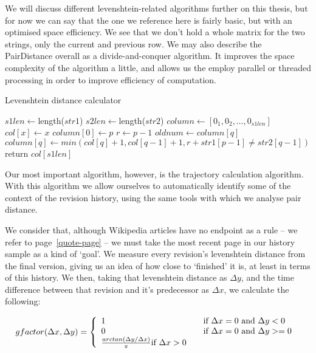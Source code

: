 We will discuss different levenshtein-related algorithms further on
this thesis, but for now we can say that the one we reference here is
fairly basic, but with an optimised space efficiency. We see that we
don't hold a whole matrix for the two strings, only the current and
previous row. We may also describe the PairDistance overall as a
divide-and-conquer algorithm. It improves the space complexity of the
algorithm a little, and allows us the employ parallel or threaded
processing in order to improve efficiency of computation.

\begin{algorithm}
  \caption{Levenshtein distance calculator}\label{lev-dist}
  \begin{algorithmic}
    \State $s1len \gets $length($str1$)
    \State $s2len \gets $length($str2$)
    \State $column \gets [0_{1}, 0_{2}, \ldots, 0_{s1len}]$
    \State $col[x] \gets x$
    \EndFor
    \State $column[0] \gets p$
    \State $r \gets p-1$
    \State $oldnum \gets column[q]$
    \State $column[q] \gets min(col[q]+1, col[q-1] + 1, r + str1[p-1] \neq str2[q-1])$
    \EndFor
    \EndFor
    \State return $col[s1len]$
    \EndFunction
  \end{algorithmic}
\end{algorithm}

Our most important algorithm, however, is the trajectory calculation
algorithm. With this algorithm we allow ourselves to automatically
identify some of the context of the revision history, using the same
tools with which we analyse pair distance.

We consider that, although Wikipedia articles have no endpoint as a
rule -- we refer to page~\ref{quote-page} -- we must take the most
recent page in our history sample as a kind of `goal'. We measure
every revision's levenshtein distance from the final version, giving
us an idea of how close to `finished' it is, at least in terms of this
history. We then, taking that levenshtein distance as $\Delta y$, and
the time difference between that revision and it's predecessor as
$\Delta x$, we calculate the following:

\[gfactor(\Delta x,\Delta y) = \left\{ 
\begin{array}{l l l}
  1 & \quad \text{if ${\Delta}x = 0$ and ${\Delta}y < 0$ }\\
  0 & \quad \text{if ${\Delta}x = 0$ and ${\Delta}y >= 0$ }\\
  \frac{arctan({\Delta}y/{\Delta}x)}{\pi}\text{if ${\Delta}x > 0$}
\end{array} \right.\]

